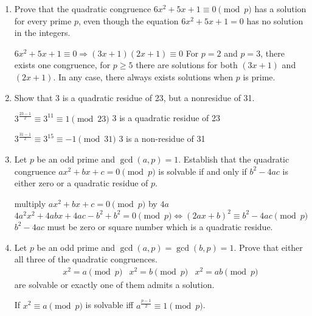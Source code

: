 \documentclass[12pt]{exam}
\theoremstyle{definition}
\begin{document}
\begin{enumerate}
    \item Prove that the quadratic congruence $6x^2 + 5x + 1 \equiv 0 \pmod p$ has a solution for every
    prime $p$, even though the equation $6x^2 + 5x + 1 = 0$ has no solution in the integers.

        \begin{answer}
            $6x^2 + 5x + 1 \equiv 0 \Rightarrow (3x + 1)(2x + 1) \equiv 0$
            For $p = 2$ and $p = 3$, there exists one congruence, for $p \ge 5$ there are solutions for both
            $(3x+1)$ and $(2x+1)$. In any case, there always exists solutions when $p$ is prime.
        \end{answer}

    \setcounter{enumi}{3}
    \item Show that 3 is a quadratic residue of 23, but a nonresidue of 31.
        \begin{answer}
            $3^{\frac{23 - 1}{2}} \equiv 3^{11} \equiv 1 \pmod{23}$
            3 is a quadratic residue of 23

            $3^{\frac{31-1}{2}} \equiv 3^{15} \equiv -1 \pmod{31}$
            3 is a non-residue of 31
        \end{answer}
    
    \setcounter{enumi}{5}
    \item Let $p$ be an odd prime and $\gcd(a, p) = 1$. Establish that the quadratic congruence
    $ax^2 + bx + c = 0 \pmod p$ is solvable if and only if $b^2 - 4ac$ is either zero or a quadratic
    residue of $p$.
        \begin{answer}
            multiply $ax^2 + bx + c = 0 \pmod p$ by $4a$
            $4a^2x^2 + 4abx + 4ac - b^2 + b^2 = 0 \pmod p \Leftrightarrow {(2ax + b)}^2 \equiv b^2 -4ac \pmod p$ 
            $b^2 -4ac$ must be zero or square number which is a quadratic residue.
        \end{answer}

    \setcounter{enumi}{9}
    \item Let $p$ be an odd prime and $\gcd(a, p) = \gcd(b, p) = 1$. Prove that either all three of the
    quadratic congruences.
    \[
        \begin{aligned}
            x^2 =a \pmod p & x^2 = b \pmod p & x^2 = ab \pmod p
        \end{aligned}
    \]
    are solvable or exactly one of them admits a solution.
        \begin{answer}
            If $x^2 \equiv a \pmod p$ is solvable iff $a^{\frac{p-1}{2}} \equiv 1 \pmod p$.


\end{answer}
\end{enumerate}
\end{document}
